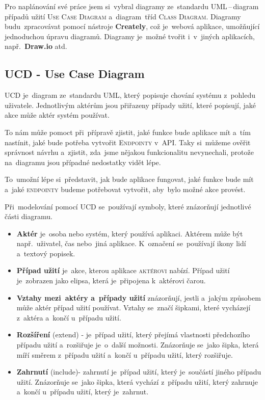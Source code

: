 \documentclass[14pt,a4paper]{article}
\begin{document}
        Pro naplánování své práce jsem si~vybral diagramy ze~standardu \textsc{UML}\,--\,diagram případů užití \textsc{Use Case Diagram} a~diagram~tříd \textsc{Class Diagram}. Diagramy budu~zpracovávat pomocí nástroje \textbf{Creately}, což je~webová aplikace, umožňující jednoduchou úpravu diagramů. Diagramy je~možné tvořit i~v~jiných aplikacích, např.~\textbf{Draw.io} atd.

        \subsection{UCD - Use Case Diagram}
        \textsc{UCD} je~diagram ze~standardu \textsc{UML}, který popisuje chování systému z~pohledu uživatele. Jednotlivým aktérům jsou přiřazeny případy užití, které popisují, jaké akce může aktér systém používat.

        To nám může pomoct při~přípravě zjistit,  jaké funkce bude aplikace mít a~tím nastínit, jaké bude potřeba vytvořit \textsc{Endpointy} v~\textsc{API}.
        Taky si~můžeme ověřit správnost návrhu a~zjistit, zda~jsme nějakou funkcionalitu nevynechali, protože na~diagramu jsou případné nedostatky vidět lépe.
        
        To~umožní lépe si~představit, jak bude aplikace fungovat, jaké funkce bude mít a~jaké \textsc{endpointy} budeme potřebovat vytvořit, aby~bylo možné akce provést. \parencite{uml:usecase}

        Při~modelování pomocí \textsc{UCD} se~používají symboly, které znázorňují jednotlivé části diagramu.
        \begin{itemize}
            \item \textbf{Aktér} je~osoba nebo systém, který používá aplikaci. Aktérem může být např.~uživatel, čas nebo~jiná aplikace. K~označení se~používají ikony lidí a~textový popisek.
            \item \textbf{Případ užití} je~akce, kterou aplikace \textsc{aktérovi} nabízí. Případ užití je~zobrazen jako elipsa, která je~připojena k~aktérovi čarou.
            \item \textbf{Vztahy mezi~aktéry a~případy užití} znázorňují, jestli a~jakým způsobem může aktér případ užití používat. Vztahy se~značí šipkami, které vycházejí z~aktéra a~končí u~případu užití.
            \item \textbf{Rozšíření} (extend) - je~případ užití, který přejímá vlastnosti předchozího případu užití a~rozšiřuje je~o~další možnosti. Znázorňuje se~jako šipka, která míří směrem z~případu užití a~končí u~případu užití, který rozšiřuje.
            \item \textbf{Zahrnutí} (include)- zahrnutí je~případ užití, který je~součástí jiného případu užití. Znázorňuje se~jako šipka, která vychází z~případu užití, který zahrnuje a~končí u~případu užití, který je~zahrnut.
        \end{itemize}
\end{document}
